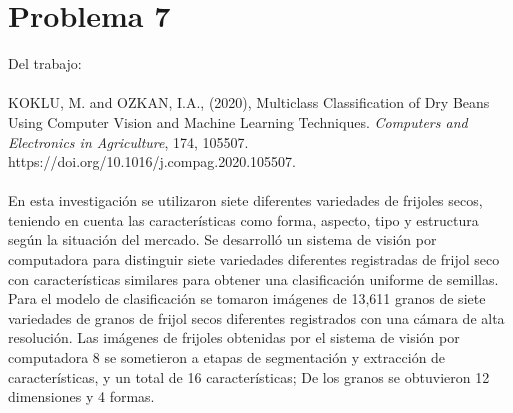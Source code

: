 \documentclass[a4paper,12pt]{article}
\begin{document}
\section*{Problema 7}
Del trabajo:\\
\\KOKLU, M. and OZKAN, I.A., (2020), Multiclass Classification of Dry Beans Using Computer Vision and Machine Learning Techniques. \textit{Computers and Electronics in Agriculture}, 174, 105507.
https://doi.org/10.1016/j.compag.2020.105507.\\
\\En esta investigación se utilizaron siete diferentes variedades de frijoles secos, teniendo en cuenta las características como forma, aspecto, tipo y estructura según la situación del mercado. Se desarrolló un sistema de visión por computadora para distinguir siete variedades diferentes registradas de frijol seco con características similares para obtener una clasificación uniforme de semillas. Para el modelo de clasificación se tomaron imágenes de 13,611 granos de siete variedades de granos de frijol secos diferentes registrados con una cámara de alta resolución. Las imágenes de frijoles obtenidas por el sistema de visión por computadora 8 se sometieron a etapas de segmentación y extracción de características, y un total de 16 características; De los granos se obtuvieron 12 dimensiones y 4 formas.
\end{document}
